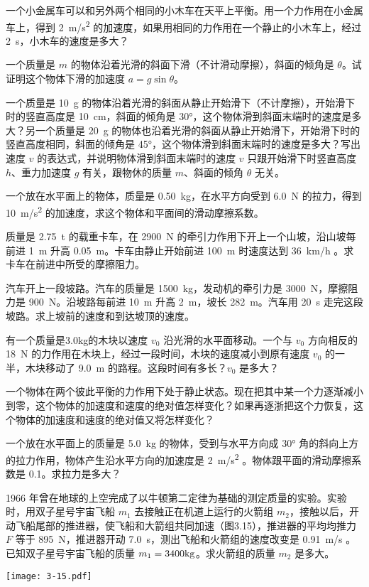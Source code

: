 \begin{Exercise}
\begin{question}
  \item 一个小金属车可以和另外两个相同的小木车在天平上平衡。用一个力作用在小金属车上，得到 \qty{2}{m/s^2} 的加速度，如果用相同的力作用在一个静止的小木车上，经过 \qty{2}{s}，小木车的速度是多大？
  \item  一个质量是 $m$ 的物体沿着光滑的斜面下滑（不计滑动摩擦），斜面的倾角是 $\theta$。试证明这个物体下滑的加速度 $a=g\sin\theta$。
  \item  一个质量是 \qty{10}{g} 的物体沿着光滑的斜面从静止开始滑下（不计摩擦），开始滑下时的竖直高度是 \qty{10}{cm}，斜面的倾角是 \ang{30}，这个物体滑到斜面末端时的速度是多大？另一个质量是 \qty{20}{g} 的物体也沿着光滑的斜面从静止开始滑下，开始滑下时的竖直高度相同，斜面的倾角是 \ang{45}，这个物体滑到斜面末端时的速度是多大？写出速度 $v$ 的表达式，并说明物体滑到斜面末端时的速度 $v$ 只跟开始滑下时竖直高度 $h$、重力加速度 $g$ 有关，跟物休的质量 $m$、斜面的倾角 $\theta$ 无关。
\item  一个放在水平面上的物体，质量是 \qty{0.50}{kg}，在水平方向受到 \qty{6.0}{N} 的拉力，得到 \qty{10}{m/s^2} 的加速度，求这个物体和平面间的滑动摩擦系数。
\item 质量是 \qty{2.75}{t} 的载重卡车，在 \qty{2900}{N} 的牵引力作用下开上一个山坡，沿山坡每前进 \qty{1}{m} 升高 \qty{0.05}{m}。卡车由静止开始前进 \qty{100}{m} 时速度达到 \qty{36}{km/h} 。求卡车在前进中所受的摩擦阻力。
\item  汽车开上一段坡路。汽车的质量是 \qty{1500}{kg}，发动机的牵引力是 \qty{3000}{N}，摩擦阻力是 \qty{900}{N}。沿坡路每前进 \qty{10}{m} 升高 \qty{2}{m}，坡长 \qty{282}{m}。汽车用 \qty{20}{s} 走完这段坡路。求上坡前的速度和到达坡顶的速度。
\item  有一个质量是{3.0}{kg}的木块以速度 $v_0$ 沿光滑的水平面移动。一个与 $v_0$ 方向相反的 \qty{18}{N} 的力作用在木块上，经过一段时间，木块的速度减小到原有速度 $v_0$ 的一半，木块移动了 \qty{9.0}{m} 的路程。这段时间有多长？$v_0$ 是多大？
\item  一个物体在两个彼此平衡的力作用下处于静止状态。现在把其中某一个力逐渐减小到零，这个物体的加速度和速度的绝对值怎样变化？如果再逐浙把这个力恢复，这个物体的加速度和速度的绝对值又将怎样变化？
\item  一个放在水平面上的质量是 \qty{5.0}{kg} 的物体，受到与水平方向成 \ang{30} 角的斜向上方的拉力作用，物体产生沿水平方向的加速度是 \qty{2}{m/s^2} 。物体跟平面的滑动摩擦系数是 0.1。求拉力是多大？
\item\label{qn:rocket_test}  1966 年曾在地球的上空完成了以牛顿第二定律为基础的测定质量的实验。实验时，用双子星号宇宙飞船 $m_1$ 去接触正在机道上运行的火箭组 $m_2$，接触以后，开动飞船尾部的推进器，使飞船和大箭组共同加速（图3.15），推进器的平均均推力 $F$ 等于 \qty{895}{N}，推进器开动 \qty{7.0}{s}，测出飞船和火箭组的速度改变是 \qty{0.91}{m/s} 。已知双子星号宇宙飞船的质量 $m_1=3400{\rm kg}$。求火箭组的质量 $m_2$ 是多大。
\begin{figurehere}
  \begin{minipage}{\linewidth}\centering
    \texttt{[image: 3-15.pdf]}
    \caption{}\label{fig:3-15}
  \end{minipage}
\end{figurehere}


\end{question}
\end{Exercise}
